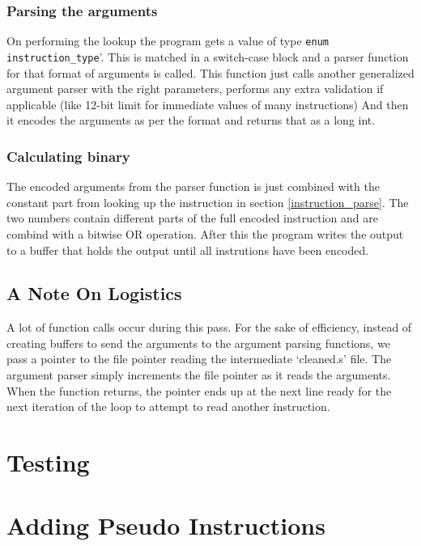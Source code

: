 \documentclass[journal,12pt,onecolumn]{IEEEtran}
\theoremstyle{remark}
\begin{document}
			\subsubsection{Parsing the arguments}
			On performing the lookup the program gets a value of type \verb|enum instruction_type|'. This is matched in a switch-case block and a parser function for that format of arguments is called.
			This function just calls another generalized argument parser with the right parameters, performs any extra validation if applicable (like 12-bit limit for immediate values of many instructions)
			And then it encodes the arguments as per the format and returns that as a long int.

			\subsubsection{Calculating binary}
			The encoded arguments from the parser function is just combined with the constant part from looking up the instruction in section \ref{instruction_parse}. The two numbers contain different parts of the full encoded instruction and are combind with a bitwise OR operation.
			After this the program writes the output to a buffer that holds the output until all instrutions have been encoded.

			\subsection{A Note On Logistics}
			A lot of function calls occur during this pass. For the sake of efficiency, instead of creating buffers to send the arguments to the argument parsing functions, we pass a pointer to the file pointer reading the intermediate `cleaned.s' file. The argument parser simply increments the file pointer as it reads the arguments. When the function returns, the pointer ends up at the next line ready for the next iteration of the loop to attempt to read another instruction.


	\section{Testing}

	\section{Adding Pseudo Instructions}
	
\end{document}
